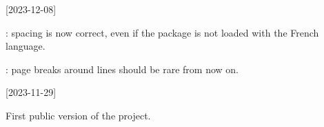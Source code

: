 \tdocsep




[2023-12-08]

\begin{tdocfix}
    \item {}: spacing is now correct, even if the  package is not loaded with the French language.

    \item {}: page breaks around  lines should be rare from now on.
\end{tdocfix}

\tdocsep




[2023-11-29]

First public version of the project.


